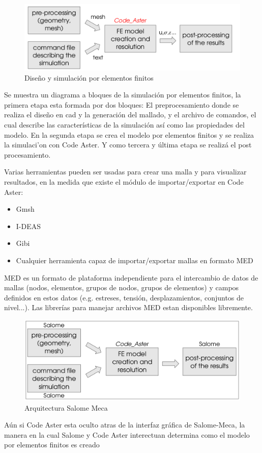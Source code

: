 \documentclass[12pt]{book}
\theoremstyle{definition}
\theoremstyle{remark}
\theoremstyle{plain}
\begin{document}
\begin{figure}
\centering
\includegraphics[width=5in]{Procesamiento.png}
\caption{Diseño y simulación por elementos finitos}
\label{fig1}
\end{figure}
Se muestra un diagrama a bloques de la simulación por elementos finitos, la
primera etapa esta formada por dos bloques: El preprocesamiento donde se
realiza el diseño en cad y la generación del mallado, y el archivo de
comandos, el cual describe las características de la simulación así como las
propiedades del modelo. En la segunda etapa se crea el modelo por elementos
finitos y se realiza la simulaci'on con Code Aster. Y como tercera y última
etapa se realizá el post procesamiento.

Varias herramientas pueden ser usadas para crear una malla y para 
visualizar resultados, en la medida que existe el módulo de importar/exportar 
en Code Aster:
\begin{itemize}
 \item Gmsh
 \item I-DEAS
 \item Gibi
 \item Cualquier herramienta capaz de importar/exportar mallas en formato MED
\end{itemize}

MED es un formato de plataforma independiente para el intercambio de datos de mallas
(nodos, elementos, grupos de nodos, grupos de elementos) y campos definidos en estos 
datos (e.g. estreses, tensión, desplazamientos, conjuntos de nivel...). Las 
librerías para manejar archivos MED estan disponibles libremente. 

\begin{figure}
\centering
\includegraphics[width=5in]{SalomeMeca.png}
\caption{Arquitectura Salome Meca}
\label{fig2}
\end{figure}
Aún si Code Aster esta oculto atras de la interfaz gráfica de Salome-Meca, la manera 
en la cual Salome y Code Aster interectuan determina como el modelo por elementos
finitos es creado
\end{document}
